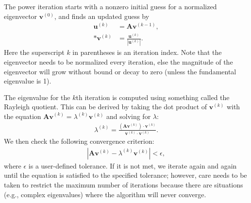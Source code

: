 The power iteration starts with a nonzero initial guess for a normalized eigenvector $\mathbf{v}^{(0)}$, and finds an updated guess by
\begin{align}
  \mathbf{u}^{(k)} &= \mathbf{A} \mathbf{v}^{(k-1)} , \\*
  \mathbf{v}^{(k)} &= \frac{ \mathbf{u}^{(k)} }{ | \mathbf{u}^{(k)} | } .
\end{align}
Here the superscript $k$ in parentheses is an iteration index. Note that the eigenvector needs to be normalized every iteration, else the magnitude of the eigenvector will grow without bound or decay to zero (unless the fundamental eigenvalue is 1).

The eigenvalue for the $k$th iteration is computed using something called the Rayleigh quotient. This can be derived by taking the dot product of $\mathbf{v}^{(k)}$ with the equation $\mathbf{A v}^{(k)} = \lambda^{(k)} \mathbf{v}^{(k)}$ and solving for $\lambda$:
\begin{align}
  \lambda^{(k)} = \frac{ ( \mathbf{A} \mathbf{v}^{(k)} ) \cdot \mathbf{v}^{(k)} }{ \mathbf{v}^{(k)} \cdot  \mathbf{v}^{(k)} } .
\end{align}
We then check the following convergence criterion:
\begin{align}
  | \mathbf{A} \mathbf{v}^{(k)} - \lambda^{(k)} \mathbf{v}^{(k)} | < \epsilon ,
\end{align}
where $\epsilon$ is a user-defined tolerance. If it is not met, we iterate again and again until the equation is satisfied to the specified tolerance; however, care needs to be taken to restrict the maximum number of iterations because there are situations (e.g., complex eigenvalues) where the algorithm will never converge. 

